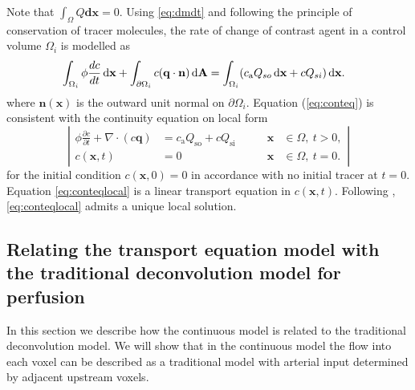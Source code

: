 \documentclass[aps,prb,article,groupedaddress,showkeys]{revtex4}
\begin{document}
	Note that $\int_\Omega Q  \mathbf{dx} = 0$. 
	Using \eqref{eq:dmdt} and following the principle of conservation of tracer molecules, the rate of change of contrast agent in a control volume $\Omega_i$ is modelled as
	\begin{align}
		& \int_{\Omega_i} \phi \frac{d c}{dt} \,\mathrm{d} \mathbf{x} + \int_{\partial \Omega_i}c(\mathbf{q} \cdot \mathbf{n}) \,\mathrm{d} \mathbf{A}
		 = \int_{\Omega_i}(c_\mathrm{a} Q_{so} \,\mathrm{d} \mathbf{x} + c Q_{si}) \,\mathrm{d} \mathbf{x}.
		\label{eq:conteq}
	\end{align}
	where $\mathbf{n}(\mathbf{x})$ is the outward unit normal on $\partial \Omega_i$.
	Equation (\ref{eq:conteq}) is consistent with the continuity equation on local form
	\begin{equation}
		\left\vert
		\begin{alignedat}{2}
			\phi \frac{\partial c}{\partial t} + \nabla \cdot (c\mathbf{q}) &= c_\mathrm{a}Q_{\mathrm{so}} + cQ_{\mathrm{si}} \qquad	&\mathbf{x} &\in \Omega, \ t>0,  \\
			c(\mathbf{x},t) &= 0 																			 	&\mathbf{x} &\in \Omega, \ t=0.
		\end{alignedat}
		\right\vert
		\label{eq:conteqlocal}
	\end{equation}
	for the initial condition $c(\mathbf{x},0) = 0$ in accordance with no initial tracer at $t = 0$.
	Equation \eqref{eq:conteqlocal} is a linear transport equation in $c(\mathbf{x},t)$. 
	Following \cite{evans98}, \eqref{eq:conteqlocal} admits a unique local solution.


\subsection{Relating the transport equation model with the traditional deconvolution model for perfusion}\label{sec:NewAndOld}
	In this section we describe how the continuous model is related to the traditional deconvolution model.
	We will show that in the continuous model the flow into each voxel can be described as a traditional model with arterial input determined by adjacent upstream voxels.
\end{document}
